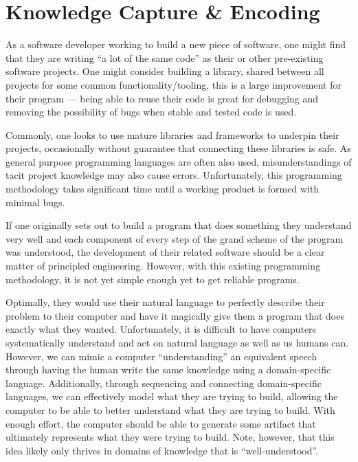 \section{Knowledge Capture \& Encoding}


As a software developer working to build a new piece of software, one might find
that they are writing ``a lot of the same code'' as their or other pre-existing
software projects. One might consider building a library, shared between all
projects for some common functionality/tooling, this is a large improvement for
their program --- being able to reuse their code is great for debugging and
removing the possibility of bugs when stable and tested code is used.


Commonly, one looks to use mature libraries and frameworks to underpin their
projects, occasionally without guarantee that connecting these libraries is
safe. As general purpose programming languages are often also used,
misunderstandings of tacit project knowledge may also cause errors.
Unfortunately, this programming methodology takes significant time until a
working product is formed with minimal bugs.

If one originally sets out to build a program that does something they
understand very well and each component of every step of the grand scheme of the
program was understood, the development of their related software should be a
clear matter of principled engineering. However, with this existing programming
methodology, it is not yet simple enough yet to get reliable programs.

Optimally, they would use their natural language to perfectly describe their
problem to their computer and have it magically give them a program that does
exactly what they wanted. Unfortunately, it is difficult to have computers
systematically understand and act on natural language as well as us humans can.
However, we can mimic a computer ``understanding'' an equivalent speech through
having the human write the same knowledge using a domain-specific language.
Additionally, through sequencing and connecting domain-specific languages, we
can effectively model what they are trying to build, allowing the computer to be
able to better understand what they are trying to build. With enough effort, the
computer should be able to generate some artifact that ultimately represents
what they were trying to build. Note, however, that this idea likely only
thrives in domains of knowledge that is ``well-understood''.

